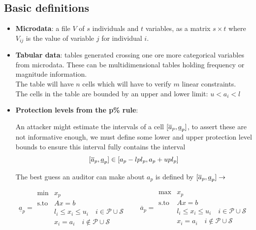 \documentclass[11pt,a4paper]{article}
\begin{document}
\subsection{Basic definitions}
\begin{itemize}
\item \textbf{Microdata}: a file $V$ of $s$ individuals and $t$ variables, as a
matrix $s \times t$ where $V_{ij}$ is the value of variable $j$ for individual $i$.
\item \textbf{Tabular data}: tables generated crossing one ore more categorical variables 
from microdata.
These can be multidimensional tables holding frequency or magnitude information.\\
The table will have $n$ cells which will have to verify $m$ linear constraints.\\
The cells in the table are bounded by an upper and lower limit: $u<a_i<l$
\item \textbf{Protection levels from the p\% rule}:

An attacker might estimate the intervals of a cell
$[\overline{a}_p,  \underbar{$a$}_p]$, to assert these are not informative enough,
we must define some lower and upper protection level bounds to ensure this interval
fully contains the interval
\begin{equation}
  \label{eq:prot-lvls}
  [\overline{a}_p,  \underbar{$a$}_p]\in[a_p-lpl_p, a_p+upl_p]
\end{equation}

The best guess an auditor can make about $a_p$ is defined by $[\overline{a}_p,  \underbar{$a$}_p]\rightarrow$

\begin{equation}
\underline{a}_p = 
\begin{array}{ll} 
\min & x_p \\ 
\text{s.to} & Ax = b \\ 
& l_i \leq x_i \leq u_i \quad i \in \mathcal{P} \cup \mathcal{S} \\ 
& x_i = a_i \quad i \notin \mathcal{P} \cup \mathcal{S} 
\end{array} 
\qquad 
\overline{a}_p = 
\begin{array}{ll} 
\max & x_p \\ 
\text{s.to} & Ax = b \\ 
& l_i \leq x_i \leq u_i \quad i \in \mathcal{P} \cup \mathcal{S} \\ 
& x_i = a_i \quad i \notin \mathcal{P} \cup \mathcal{S} 
\end{array} 
\end{equation}


\end{itemize}
\end{document}
